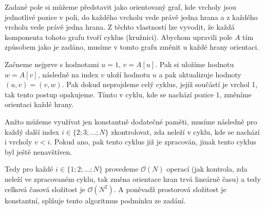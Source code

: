 \documentclass{fkssolpub}
\author{Ondřej Sedláček}
\begin{document}
Zadané pole si můžeme představit jako orientovaný graf, kde vrcholy jsou jednotlivé pozice v poli, do každého vrcholu vede právě jedna hrana a z každého vrcholu vede právě jedna hrana. Z těchto vlastností lze vyvodit, že každá komponenta tohoto grafu tvoří cyklus (kružnici). Abychom upravili pole $A$ tím způsobem jako je zadáno, musíme v tomto grafu změnit u každé hrany orientaci.

Začneme nejprve s hodnotami $u = 1$, $v = A[u]$. Pak si uložíme hodnotu $w = A[v]$, následně na index $v$ uloží hodnotu $u$ a pak aktualizuje hodnoty $(u, v) = (v, w)$. Pak dokud neprojdeme celý cyklus, jejíž součástí je vrchol 1, tak tento postup opakujeme. Tímto v cyklu, kde se nachází pozice 1, změníme orientaci každé hrany.

Anžto můžeme využívat jen konstantně dodatečné paměti, musíme následně pro každý další index $i \in \{2; 3; ...; N\}$ zkontrolovat, zda neleží v cyklu, kde se nachází i vrcholy $v < i$. Pokud ano, pak tento cyklus již je zpracován, jinak tento cyklus byl ještě nenavštíven.

Tedy pro každé $i \in \{1;2; ...; N\}$ provedeme $\mathcal{O}(N)$ operací (jak kontrola, zda neleží ve zpracovaném cyklu, tak změna orientace hran trvá lineárně času) a tedy celková časová složitost je $\mathcal{O}(N^2)$. A poněvadž prostorová složitost je konstantní, splňuje tento algoritmus podmínku ze zadání.
\end{document}
